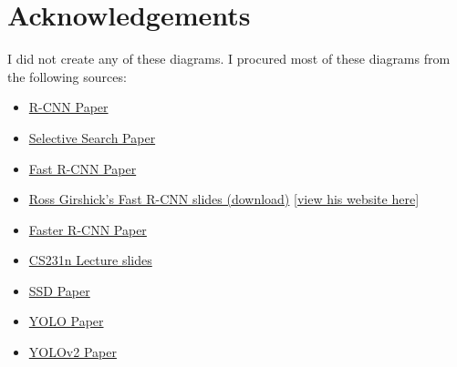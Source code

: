 \documentclass{article}
\begin{document}
\section{Acknowledgements}
I did not create any of these diagrams. I procured most of these diagrams from the following sources:

\begin{itemize}
    \item \href{https://arxiv.org/pdf/1311.2524.pdf}{R-CNN Paper}
    \item \href{http://people.cs.uchicago.edu/~pff/papers/seg-ijcv.pdf}{Selective Search Paper}
    \item \href{https://arxiv.org/pdf/1504.08083.pdf}{Fast R-CNN Paper}
    \item \href{https://dl.dropboxusercontent.com/s/vlyrkgd8nz8gy5l/fast-rcnn.pdf?dl=0}{Ross Girshick's Fast R-CNN slides (download)} \href{http://www.rossgirshick.info/}{[view his website here]}
    \item \href{https://arxiv.org/pdf/1506.01497.pdf}{Faster R-CNN Paper}
    \item \href{http://cs231n.stanford.edu/slides/2017/cs231n_2017_lecture11.pdf}{CS231n Lecture slides}
    \item \href{https://arxiv.org/pdf/1512.02325.pdf}{SSD Paper}
    \item \href{https://pjreddie.com/media/files/papers/yolo.pdf}{YOLO Paper}
    \item \href{https://arxiv.org/pdf/1612.08242.pdf}{YOLOv2 Paper}
\end{itemize}
\end{document}
